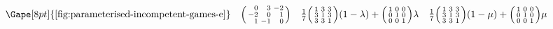 \[\begin{array}{ c c c c }
    \Gape[8pt]{\text{\autoref{fig:parameterised-incompetent-games-e}}} &
        \begin{psmallmatrix*}[r] 
            0 & 3 & -2 \\
            -2 & 0 & 1 \\
            1 & -1 & 0 \\
        \end{psmallmatrix*} &
        \frac{1}{7}
        \begin{psmallmatrix}
            1 & 3 & 3 \\
            3 & 1 & 3 \\
            3 & 3 & 1 \\
        \end{psmallmatrix}
        (1 - \lambda) +
        \begin{psmallmatrix}
            1 & 0 & 0 \\
            0 & 1 & 0 \\
            0 & 0 & 1 \\
        \end{psmallmatrix}
        \lambda &
        \frac{1}{7}
        \begin{psmallmatrix}
            1 & 3 & 3 \\
            3 & 1 & 3 \\
            3 & 3 & 1 \\
        \end{psmallmatrix}
        (1 - \mu) +
        \begin{psmallmatrix}
            1 & 0 & 0 \\
            0 & 1 & 0 \\
            0 & 0 & 1 \\
        \end{psmallmatrix}
        \mu \\


\end{array}\]

